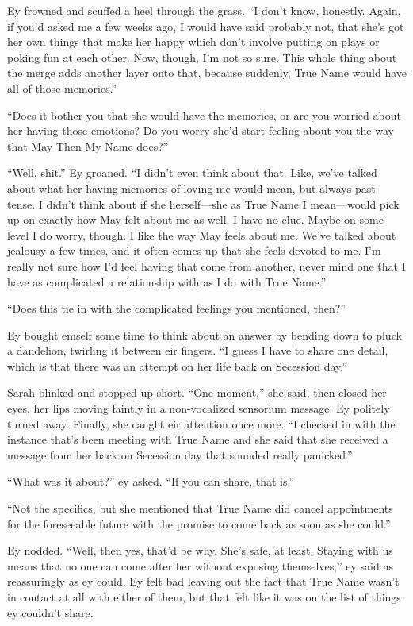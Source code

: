 Ey frowned and scuffed a heel through the grass. ``I don't know, honestly. Again, if you'd asked me a few weeks ago, I would have said probably not, that she's got her own things that make her happy which don't involve putting on plays or poking fun at each other. Now, though, I'm not so sure. This whole thing about the merge adds another layer onto that, because suddenly, True Name would have all of those memories.''

``Does it bother you that she would have the memories, or are you worried about her having those emotions? Do you worry she'd start feeling about you the way that May Then My Name does?''

``Well, shit.'' Ey groaned. ``I didn't even think about that. Like, we've talked about what her having memories of loving me would mean, but always past-tense. I didn't think about if she herself—she as True Name I mean—would pick up on exactly how May felt about me as well. I have no clue. Maybe on some level I do worry, though. I like the way May feels about me. We've talked about jealousy a few times, and it often comes up that she feels devoted to me. I'm really not sure how I'd feel having that come from another, never mind one that I have as complicated a relationship with as I do with True Name.''

``Does this tie in with the complicated feelings you mentioned, then?''

Ey bought emself some time to think about an answer by bending down to pluck a dandelion, twirling it between eir fingers. ``I guess I have to share one detail, which is that there was an attempt on her life back on Secession day.''

Sarah blinked and stopped up short. ``One moment,'' she said, then closed her eyes, her lips moving faintly in a non-vocalized sensorium message. Ey politely turned away. Finally, she caught eir attention once more. ``I checked in with the instance that's been meeting with True Name and she said that she received a message from her back on Secession day that sounded really panicked.''

``What was it about?'' ey asked. ``If you can share, that is.''

``Not the specifics, but she mentioned that True Name did cancel appointments for the foreseeable future with the promise to come back as soon as she could.''

Ey nodded. ``Well, then yes, that'd be why. She's safe, at least. Staying with us means that no one can come after her without exposing themselves,'' ey said as reassuringly as ey could. Ey felt bad leaving out the fact that True Name wasn't in contact at all with either of them, but that felt like it was on the list of things ey couldn't share.

